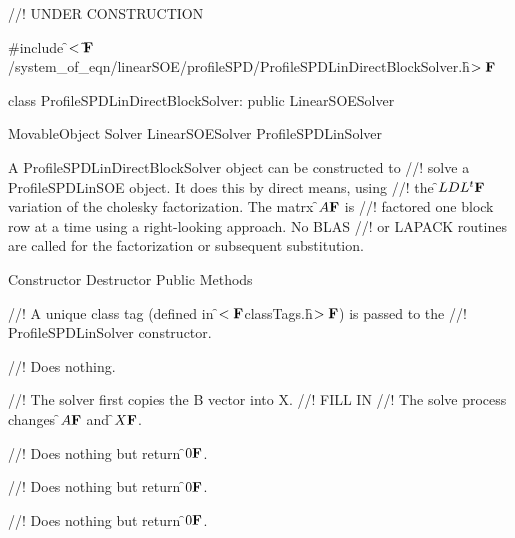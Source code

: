 
//! UNDER CONSTRUCTION 

\indent \#include \f$<\tilde{
}{\bf F}$/system\_of\_eqn/linearSOE/profileSPD/ProfileSPDLinDirectBlockSolver.h\f$>{\bf F}$
 

\indent class ProfileSPDLinDirectBlockSolver: public LinearSOESolver

\indent MovableObject
\indent\indent  Solver
\indent\indent\indent LinearSOESolver
\indent\indent\indent\indent ProfileSPDLinSolver
\indent\indent\indent\indent{}

\indent A ProfileSPDLinDirectBlockSolver object can be constructed to
//! solve a ProfileSPDLinSOE object. It does this by direct means, using
//! the \f$LDL^t{\bf F}$ variation of the cholesky factorization. The matrx \f$A{\bf F}$ is
//! factored one block row at a time using a right-looking approach. No BLAS
//! or LAPACK routines are called for the factorization or subsequent substitution.

\indent\indent Constructor
\indent{}
\indent\indent Destructor
\indent{}
\indent\indent Public Methods
\indent{}
\indent{}
\indent{} 
\indent{} 


//! A unique class tag (defined in \f$<{\bf F}$classTags.h\f$>{\bf F}$) is passed to the
//! ProfileSPDLinSolver constructor.


//! Does nothing.

//! The solver first copies the B vector into X.
//! FILL IN
//! The solve process changes \f$A{\bf F}$ and \f$X{\bf F}$.   


//! Does nothing but return \f$0{\bf F}$.

//! Does nothing but return \f$0{\bf F}$.

//! Does nothing but return \f$0{\bf F}$.







